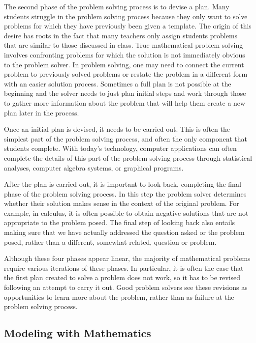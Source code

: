 \documentclass[
]{book}
\theoremstyle{definition}
\theoremstyle{definition}
\theoremstyle{definition}
\theoremstyle{remark}
\begin{document}
The second phase of the problem solving process is to devise a plan. Many students struggle in the problem solving process because they only want to solve problems for which they have previously been given a template. The origin of this desire has roots in the fact that many teachers only assign students problems that are similar to those discussed in class. True mathematical problem solving involves confronting problems for which the solution is not immediately obvious to the problem solver. In problem solving, one may need to connect the current problem to previously solved problems or restate the problem in a different form with an easier solution process. Sometimes a full plan is not possible at the beginning and the solver needs to just plan initial steps and work through those to gather more information about the problem that will help them create a new plan later in the process.

Once an initial plan is devised, it needs to be carried out. This is often the simplest part of the problem solving process, and often the only component that students complete. With today's technology, computer applications can often complete the details of this part of the problem solving process through statistical analyses, computer algebra systems, or graphical programs.

After the plan is carried out, it is important to look back, completing the final phase of the problem solving process. In this step the problem solver determines whether their solution makes sense in the context of the original problem. For example, in calculus, it is often possible to obtain negative solutions that are not appropriate to the problem posed. The final step of looking back also entails making sure that we have actually addressed the question asked or the problem posed, rather than a different, somewhat related, question or problem.

Although these four phases appear linear, the majority of mathematical problems require various iterations of these phases. In particular, it is often the case that the first plan created to solve a problem does not work, so it has to be revised following an attempt to carry it out. Good problem solvers see these revisions as opportunities to learn more about the problem, rather than as failure at the problem solving process.

\hypertarget{modeling-with-mathematics}{%
\subsection{Modeling with Mathematics}\label{modeling-with-mathematics}}
\end{document}
